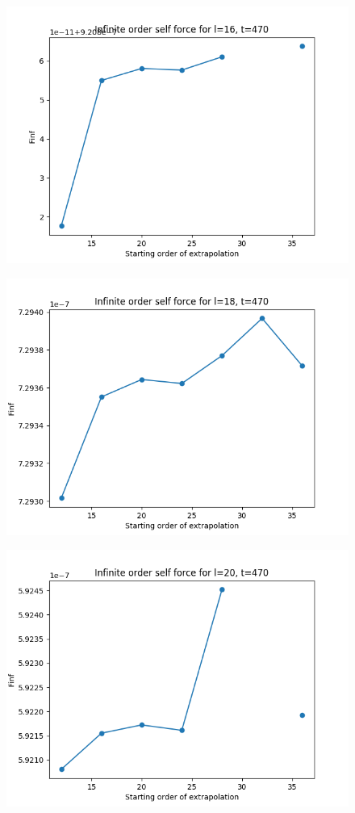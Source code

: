 \documentclass{article}
\begin{document}
\begin{figure}
  \includegraphics{bestfinfselectorplott470l16}
\end{figure}
\begin{figure}
  \includegraphics{bestfinfselectorplott470l18}
\end{figure}
\begin{figure}
  \includegraphics{bestfinfselectorplott470l20}
\end{figure}
\end{document}
